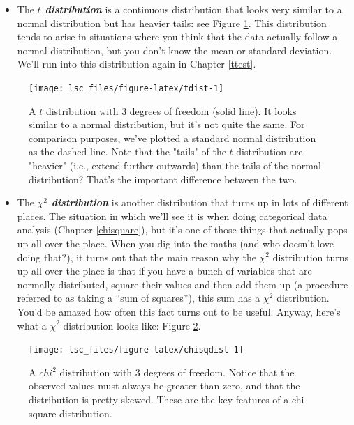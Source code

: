 \documentclass[
]{book}
\providecommand{\tightlist}{%
  \setlength{\itemsep}{0pt}\setlength{\parskip}{0pt}}
\theoremstyle{definition}
\theoremstyle{definition}
\theoremstyle{definition}
\theoremstyle{definition}
\theoremstyle{remark}
\begin{document}
\begin{itemize}
\tightlist
\item
  The \textbf{\emph{\(t\) distribution}} is a continuous distribution that looks very similar to a normal distribution but has heavier tails: see Figure \ref{fig:tdist}. This distribution tends to arise in situations where you think that the data actually follow a normal distribution, but you don't know the mean or standard deviation. We'll run into this distribution again in Chapter \ref{ttest}.
\end{itemize}

\begin{figure}

{\centering \texttt{[image: lsc\_files/figure-latex/tdist-1]} 

}

\caption{A $t$ distribution with 3 degrees of freedom (solid line). It looks similar to a normal distribution, but it's not quite the same. For comparison purposes, we've plotted a standard normal distribution as the dashed line. Note that the "tails" of the $t$ distribution are "heavier" (i.e., extend further outwards) than the tails of the normal distribution? That's the important difference between the two. }\label{fig:tdist}
\end{figure}

\begin{itemize}
\tightlist
\item
  The \textbf{\emph{\(\chi^2\) distribution}} is another distribution that turns up in lots of different places. The situation in which we'll see it is when doing categorical data analysis (Chapter \ref{chisquare}), but it's one of those things that actually pops up all over the place. When you dig into the maths (and who doesn't love doing that?), it turns out that the main reason why the \(\chi^2\) distribution turns up all over the place is that if you have a bunch of variables that are normally distributed, square their values and then add them up (a procedure referred to as taking a ``sum of squares''), this sum has a \(\chi^2\) distribution. You'd be amazed how often this fact turns out to be useful. Anyway, here's what a \(\chi^2\) distribution looks like: Figure \ref{fig:chisqdist}.
\end{itemize}

\begin{figure}

{\centering \texttt{[image: lsc\_files/figure-latex/chisqdist-1]} 

}

\caption{A $chi^2$ distribution with 3 degrees of freedom. Notice that the observed values must always be greater than zero, and that the distribution is pretty skewed. These are the key features of a chi-square distribution.}\label{fig:chisqdist}
\end{figure}
\end{document}
